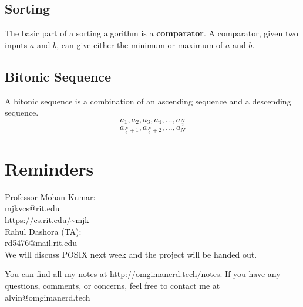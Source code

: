 \documentclass[letterpaper, 12pt]{math}
\begin{document}
\subsection*{Sorting}
The basic part of a sorting algorithm is a \textbf{comparator}. A comparator,
given two inputs \( a \) and \( b \), can give either the minimum or maximum
of \( a \) and \( b \).
\begin{center}
\end{center}
\begin{center}
\end{center}

\subsection*{Bitonic Sequence}
A bitonic sequence is a combination of an ascending sequence and a descending
sequence.
\[ a_1,a_2,a_3,a_4,\dots,a_{\frac{N}{2}} \]
\[ a_{\frac{N}{2}+1},a_{\frac{N}{2}+2},\dots,a_{N} \]

\section*{Reminders}
Professor Mohan Kumar: \\
\url{mjkvcs@rit.edu} \\
\url{https://cs.rit.edu/~mjk} \\

\noindent Rahul Dashora (TA): \\
\url{rd5476@mail.rit.edu} \\

We will discuss POSIX next week and the project will be handed out.

\begin{center}
  You can find all my notes at \url{http://omgimanerd.tech/notes}. If you have
  any questions, comments, or concerns, feel free to contact me at
  alvin@omgimanerd.tech
\end{center}
\end{document}
